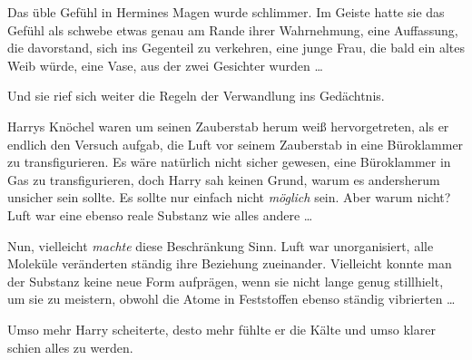 Das üble Gefühl in Hermines Magen wurde schlimmer. Im Geiste hatte sie das Gefühl als schwebe etwas genau am Rande ihrer Wahrnehmung, eine Auffassung, die davorstand, sich ins Gegenteil zu verkehren, eine junge Frau, die bald ein altes Weib würde, eine Vase, aus der zwei Gesichter wurden …

Und sie rief sich weiter die Regeln der Verwandlung ins Gedächtnis.

\later

Harrys Knöchel waren um seinen Zauberstab herum weiß hervorgetreten, als er endlich den Versuch aufgab, die Luft vor seinem Zauberstab in eine Büroklammer zu transfigurieren. Es wäre natürlich nicht sicher gewesen, eine Büroklammer in Gas zu transfigurieren, doch Harry sah keinen Grund, warum es andersherum unsicher sein sollte. Es sollte nur einfach nicht \emph{möglich} sein. Aber warum nicht? Luft war eine ebenso reale Substanz wie alles andere …

Nun, vielleicht \emph{machte} diese Beschränkung Sinn. Luft war unorganisiert, alle Moleküle veränderten ständig ihre Beziehung zueinander. Vielleicht konnte man der Substanz keine neue Form aufprägen, wenn sie nicht lange genug stillhielt, um sie zu meistern, obwohl die Atome in Feststoffen ebenso ständig vibrierten …

Umso mehr Harry scheiterte, desto mehr fühlte er die Kälte und umso klarer schien alles zu werden.

